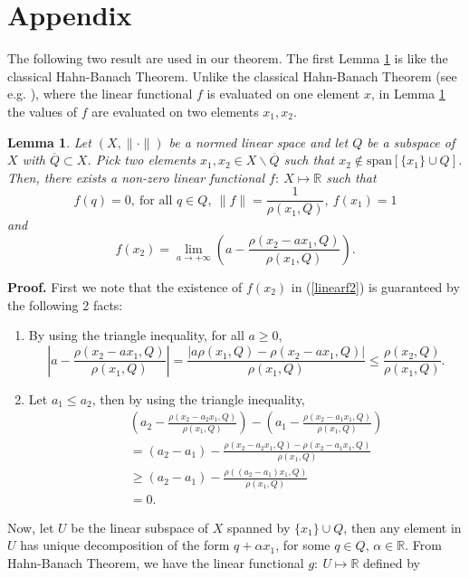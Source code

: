 \documentclass[12pt, reqno]{amsart}
\newtheorem{lemma}[theorem]{Lemma}
\theoremstyle{definition}
\theoremstyle{remark}
\numberwithin{equation}{section}
\begin{document}
\section{Appendix} 
The following two result are used in our theorem.  The first Lemma \ref{lemma1'} is like the classical Hahn-Banach Theorem. Unlike the classical Hahn-Banach Theorem (see e.g. \cite[p. 63]{Dunford}), where the linear functional $f$ is evaluated on one element $x$, in  Lemma \ref{lemma1'} the values of $f$ are evaluated on two elements $x_1,x_2$.
\begin{lemma}
\label{lemma1'}
Let $(X,\|\cdot\|)$ be a normed linear space and let $Q$ be a subspace of $X$ with $\overline Q\subset X$. Pick two elements $x_1,x_2\in X\backslash \overline Q$ such that $x_2\notin \mbox{span} [\{x_1\}\cup Q]$. Then, there exists a non-zero linear functional $f:~X\longmapsto \mathbb R$ such that
\begin{equation}
\label{linearf1}
f(q)=0,~\mbox{for all $q\in Q$},~\|f\|=\frac{1}{\rho(x_1,Q)},~f(x_1)=1
\end{equation}
and
\begin{equation}
\label{linearf2}
f(x_2)=\lim_{a\to+\infty}\left(a-\frac{\rho(x_2-a x_1,Q)}{\rho(x_1,Q)}\right).
\end{equation}
\end{lemma}
\textbf{Proof.} First we note that the existence of $f(x_2)$ in (\ref{linearf2}) is guaranteed by the following 2 facts:
\begin{enumerate}
\item By using the triangle inequality, for all $a\ge0$,
$$
\left|a-\frac{\rho(x_2-a x_1,Q)}{\rho(x_1,Q)}\right|=\frac{\left|a\rho(x_1,Q)-\rho(x_2-a x_1,Q)\right|}{\rho(x_1,Q)}\le\frac{\rho(x_2,Q)}{\rho(x_1,Q)}.
$$
\item Let $a_1\le a_2$, then by using the triangle inequality,
\begin{eqnarray}
\label{increase}
&&\left(a_2-\frac{\rho(x_2-a_2 x_1,Q)}{\rho(x_1,Q)}\right)-\left(a_1-\frac{\rho(x_2-a_1 x_1,Q)}{\rho(x_1,Q)}\right)\nonumber\\
&&=(a_2-a_1)-\frac{\rho(x_2-a_2 x_1,Q)-\rho(x_2-a_1 x_1,Q)}{\rho(x_1,Q)}\nonumber\\
&&\ge (a_2-a_1)-\frac{\rho((a_2-a_1) x_1,Q)}{\rho(x_1,Q)}\nonumber\\
&&=0.
\end{eqnarray}
\end{enumerate} 
Now,  let $U$ be the linear subspace of $X$ spanned by $\{x_1\}\cup Q$, then any element in $U$ has unique decomposition of the form $q+\alpha x_1$, for some $q\in Q$, $\alpha\in\mathbb R$. From Hahn-Banach Theorem, we have  the linear functional $g:~U\longmapsto \mathbb R$ defined by
\end{document}
